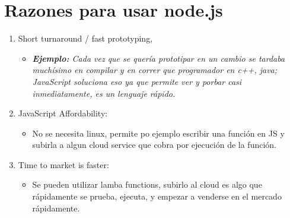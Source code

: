 \section{Razones para usar node.js}
\begin{enumerate}
    \item Short turnaround / fast prototyping, 
        \begin{itemize}
            \item \emph{\textbf{Ejemplo: }Cada vez que se quería prototipar en un cambio se tardaba muchísimo en compilar y en correr que programador en c++, java; JavaScript soluciona eso ya que permite ver y porbar casi inmediatamente, es un lenguaje rápido.}
        \end{itemize}
    \item JavaScript Affordability:    
        \begin{itemize}
            \item No se necesita linux, permite po ejemplo escribir una función en JS y subirla a algun cloud service que cobra por ejecución de la función.
        \end{itemize}
    
    \item Time to market is faster:
        \begin{itemize}
            \item Se pueden utilizar lamba functions, subirlo al cloud es algo que rápidamente se prueba, ejecuta, y empezar a venderse en el mercado rápidamente.
        \end{itemize}
\end{enumerate}

